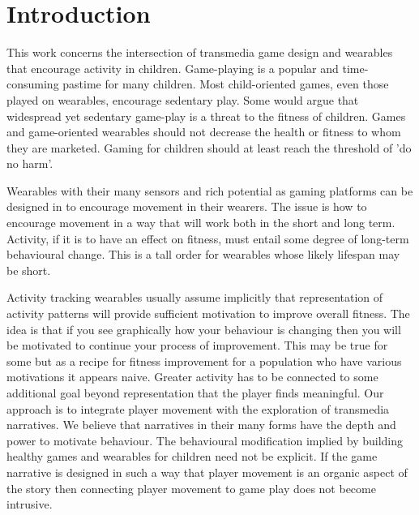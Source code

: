 \documentclass{SIGCHI2015LaTex/sigchi}
\begin{document}


\section{Introduction}
This work concerns the intersection of transmedia game design and wearables that encourage activity in children. Game-playing is a popular and time-consuming pastime for many children. Most child-oriented games, even those played on wearables, encourage sedentary play. Some would argue that widespread yet sedentary game-play is a threat to the fitness of children. Games and game-oriented wearables should not decrease the health or fitness to whom they are marketed. Gaming for children should at least reach the threshold of 'do no harm'. 

Wearables with their many sensors and rich potential as gaming platforms can be designed in to encourage movement in their wearers. The issue is how to encourage movement in a way that will work both in the short and long term. Activity, if it is to have an effect on fitness, must entail some degree of long-term behavioural change. This is a tall order for wearables whose likely lifespan may be short. 

Activity tracking wearables usually assume implicitly that representation of activity patterns will provide sufficient motivation to improve overall fitness. The idea is that if you see graphically how your behaviour is changing then you will be motivated to continue your process of improvement. This may be true for some but as a recipe for fitness improvement for a population who have various motivations it appears naive. Greater activity has to be connected to some additional goal beyond representation that the player finds meaningful. Our approach is to integrate player movement with the exploration of transmedia narratives. We believe that narratives in their many forms have the depth and power to motivate behaviour. The behavioural modification implied by building healthy games and wearables for children need not be explicit. If the game narrative is designed in such a way that player movement is an organic aspect of the story then connecting player movement to game play does not become intrusive.
\end{document}
